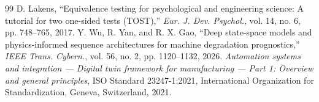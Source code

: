 \documentclass[12pt,a4paper]{article}
\begin{document}
\begin{thebibliography}{99}
 D. Lakens, ``Equivalence testing for psychological and engineering science: A tutorial for two one-sided tests (TOST),'' \textit{Eur. J. Dev. Psychol.}, vol. 14, no. 6, pp. 748--765, 2017.
 Y. Wu, R. Yan, and R. X. Gao, ``Deep state-space models and physics-informed sequence architectures for machine degradation prognostics,'' \textit{IEEE Trans. Cybern.}, vol. 56, no. 2, pp. 1120--1132, 2026.
 \textit{Automation systems and integration --- Digital twin framework for manufacturing --- Part 1: Overview and general principles}, ISO Standard 23247-1:2021, International Organization for Standardization, Geneva, Switzerland, 2021.
\end{thebibliography}
\end{document}
